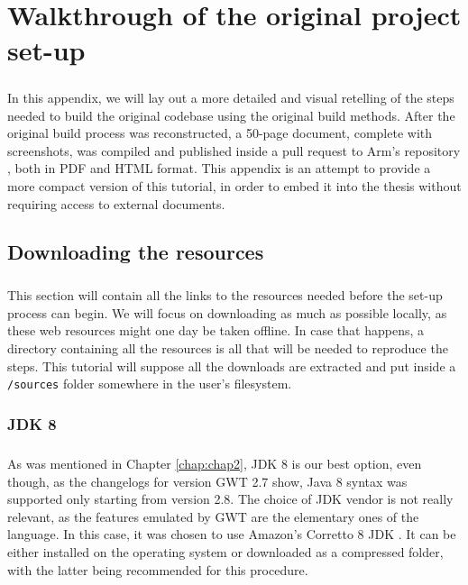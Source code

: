 \chapter{Walkthrough of the original project set-up}\label{chap:appA}
\paragraph{}
In this appendix, we will lay out a more detailed and visual retelling of the steps needed to build the original codebase using the original build methods. After the original build process was reconstructed, a 50-page document, complete with screenshots, was compiled and published inside a pull request to Arm's repository \cite{web:setuptutorialoriginal}, both in PDF and HTML format. This appendix is an attempt to provide a more compact version of this tutorial, in order to embed it into the thesis without requiring access to external documents.
\section{Downloading the resources}
\paragraph{}
This section will contain all the links to the resources needed before the set-up process can begin. We will focus on downloading as much as possible locally, as these web resources might one day be taken offline. In case that happens, a directory containing all the resources is all that will be needed to reproduce the steps. This tutorial will suppose all the downloads are extracted and put inside a \verb|/sources| folder somewhere in the user's filesystem.
\subsection{JDK 8}
\paragraph{}
As was mentioned in Chapter \ref{chap:chap2}, JDK 8 is our best option, even though, as the changelogs for version GWT 2.7 \cite{gwt2.7web} show, Java 8 syntax was supported only starting from version 2.8. The choice of JDK vendor is not really relevant, as the features emulated by GWT are the elementary ones of the language. In this case, it was chosen to use Amazon's Corretto 8 JDK \cite{web:amazoncorretto8}. It can be either installed on the operating system or downloaded as a compressed folder, with the latter being recommended for this procedure.
